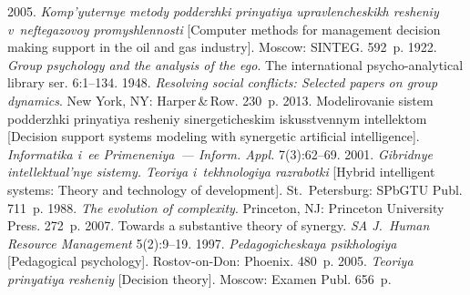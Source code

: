    






  \begin{multicols}{2}

\renewcommand{\bibname}{\protect\rmfamily References}

{\small\frenchspacing
 {%
 \begin{thebibliography}{99}
   2005. 
\textit{Komp'yuternye metody podderzhki prinyatiya uprav\-len\-che\-skikh resheniy 
v~neftegazovoy promyshlennosti} [Computer methods for management decision 
making support in the oil and gas industry]. Moscow: SINTEG. 592~p.
   1922. \textit{Group psychology and the analysis of the ego}. 
  {The 
international psycho-analytical library ser.} 6:1--134.  
   1948. \textit{Resolving social conflicts: Selected papers on 
group dynamics}. New York, NY: Harper\,\&\,Row. 230~p.
   2013. 
Modelirovanie sistem podderzhki prinyatiya resheniy si\-ner\-ge\-ti\-che\-skim 
iskusstvennym intellektom [Decision support systems modeling with synergetic 
artificial intelligence]. \textit{Informatika i~ee Primeneniya~--- Inform. Appl.} 
7(3):62--69.
   2001. \textit{Gibridnye intellektual'nye sistemy. Teoriya 
i~tekhnologiya razrabotki} [Hybrid intelligent systems: Theory and technology of 
development]. St.\ Petersburg: SPbGTU Publ. 711~p.
   1988. \textit{The evolution of complexity}. Princeton, NJ: 
Princeton University Press. 272~p.
   2007. Towards a substantive 
theory of synergy. \textit{SA J.~Human Resource Management} 5(2):9--19.
   1997. \textit{Pedagogicheskaya psikhologiya} 
[Pedagogical psychology]. Rostov-on-Don: Phoenix. 480~p.
   2005. \textit{Teoriya prinyatiya resheniy} 
[Decision theory]. Moscow: Examen Publ. 656~p.
  

\end{thebibliography}}}
\end{multicols}
